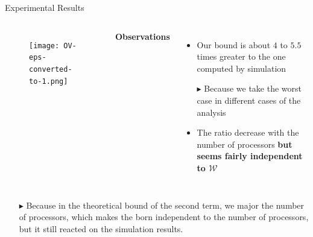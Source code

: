 \documentclass{beamer}
\begin{document}
\begin{frame}{Experimental Results}

    \begin{columns} 
        \begin{figure}
            \texttt{[image: OV-eps-converted-to-1.png]}
        \end{figure}
            \textbf{Observations}
            \begin{itemize}
                \item Our bound is about \alert{$4$} to \alert{$5.5$} times greater to the one computed by simulation  
                    \pause
                \item [\scriptsize\raise1.25pt\hbox{\donotcoloroutermaths$\blacktriangleright$}] 
                    \alert{Because we take the worst case in different cases of the analysis}  
                    \pause
                \item The ratio decrease with the number of processors \textbf{but seems fairly independent to $\mathcal{W}$ }
            \end{itemize}
    \end{columns}
            \begin{itemize}
                    \pause
                  \item  [\scriptsize\raise1.25pt\hbox{\donotcoloroutermaths$\blacktriangleright$}]
                      \alert{Because in the theoretical bound of the second term, we major the number of processors,
                      which makes the born independent to the number of processors, 
                      but it still reacted on the simulation results. }
            \end{itemize}

\end{frame}
\end{document}
